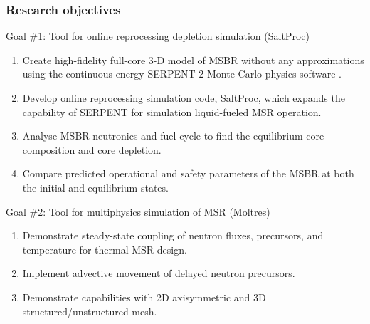 \begin{frame}
  \frametitle{Research objectives}
                  \vspace*{-0.1in}
              \begin{block}{Goal \#1: Tool for online reprocessing depletion simulation (SaltProc)\cite{rykhlevskii_saltproc}}
               \begin{enumerate}
                \item Create high-fidelity full-core 3-D model of MSBR without any approximations using the continuous-energy SERPENT 2 Monte Carlo physics software \cite{leppanen_serpent_2012}.
                \item Develop online reprocessing simulation code, SaltProc, which expands the capability of SERPENT for simulation liquid-fueled \gls{MSR} operation.
                \item Analyse \gls{MSBR} neutronics and fuel cycle to find the equilibrium core composition and core depletion.
                \item Compare predicted operational and safety parameters of the \gls{MSBR} at both the initial and equilibrium states.
               \end{enumerate}
               \end{block}

              \begin{block}{Goal \#2: Tool for multiphysics simulation of \gls{MSR} (Moltres)\cite{lindsay_introduction_2018}}
               \begin{enumerate}
                \item Demonstrate steady-state coupling of neutron fluxes, precursors, and temperature for thermal \gls{MSR} design.
                \item Implement advective movement of delayed neutron precursors.
                \item Demonstrate capabilities with 2D axisymmetric and 3D structured/unstructured mesh.
               \end{enumerate}
               \end{block}


              
\end{frame}
